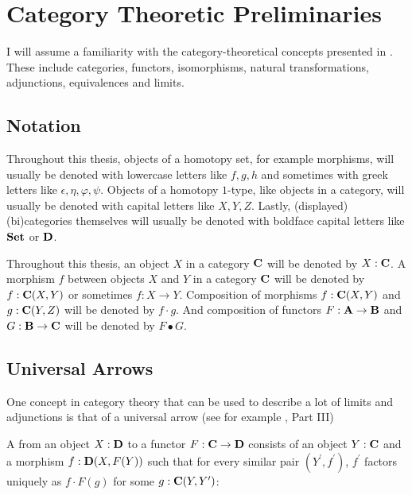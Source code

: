 \chapter{Category Theoretic Preliminaries}\label{ch:category-theory}

I will assume a familiarity with the category-theoretical concepts presented in \autocite{CT4P}. These include categories, functors, isomorphisms, natural transformations, adjunctions, equivalences and limits.

\section{Notation}
Throughout this thesis, objects of a homotopy set, for example morphisms, will usually be denoted with lowercase letters like $ f, g, h $ and sometimes with greek letters like $ \epsilon, \eta, \varphi, \psi $. Objects of a homotopy $ 1 $-type, like objects in a category, will usually be denoted with capital letters like $ X, Y, Z $. Lastly, (displayed) (bi)categories themselves will usually be denoted with boldface capital letters like $ \mathbf{Set} $ or $ \mathbf{D} $.

Throughout this thesis, an object $ X $ in a category $ \mathbf{C} $ will be denoted by $ X : \mathbf{C} $. A morphism $ f $ between objects $ X $ and $ Y $ in a category $ \mathbf{C} $ will be denoted by $ f: \mathbf{C}(X, Y) $ or sometimes $ f: X \to Y $. Composition of morphisms $ f: \mathbf{C}(X, Y) $ and $ g: \mathbf{C}(Y, Z) $ will be denoted by $ f \cdot g $. And composition of functors $ F: \mathbf{A} \to \mathbf{B} $ and $ G: \mathbf{B} \to \mathbf{C} $ will be denoted by $ F \bullet G $.

\section{Universal Arrows}

One concept in category theory that can be used to describe a lot of limits and adjunctions is that of a universal arrow (see for example \autocite{MacLane}, Part III)
\begin{definition}
  A  from an object $ X: \mathbf{D} $ to a functor $ F: \mathbf{C} \to \mathbf{D} $ consists of an object $ Y: \mathbf{C} $ and a morphism $ f: \mathbf{D}(X, F(Y)) $ such that for every similar pair $ (Y^\prime, f^\prime) $, $ f^\prime $ factors uniquely as $ f \cdot F(g) $ for some $ g: \mathbf{C}(Y, Y^\prime) $:
  \begin{center}
  \end{center}
\end{definition}

